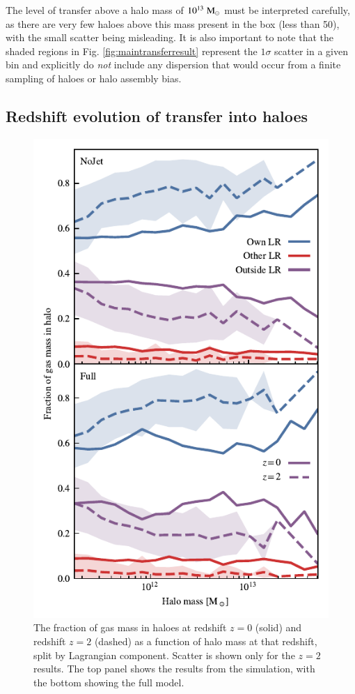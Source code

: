 The level of transfer above a halo mass of $10^{13} \;{\rm M}_{\odot}{}$ must be
interpreted carefully, as there are very few haloes above this mass present
in the box (less than 50), with the small scatter being misleading. It is
also important to note that the shaded regions in Fig.
\ref{fig:maintransferresult} represent the $1\sigma$ scatter in a given bin
and explicitly do \emph{not} include any dispersion that would occur from a
finite sampling of haloes or halo assembly bias.

\subsection{Redshift evolution of transfer into haloes}

\begin{figure}
    \centering
    \includegraphics[width=\columnwidth]{figures/component_fraction_multi_z.pdf}
    \vspace{-0.7cm}
    \caption{The fraction of gas mass in haloes at redshift $z=0$ (solid) and
    redshift $z=2$ (dashed) as a function of halo mass at that redshift, split by
    Lagrangian component. Scatter is shown only for the $z=2$ results. The top panel
    shows the results from the \nojet{} simulation, with the bottom showing the
    full \simba{} model.}
    \label{fig:ltzevo}
\end{figure}

